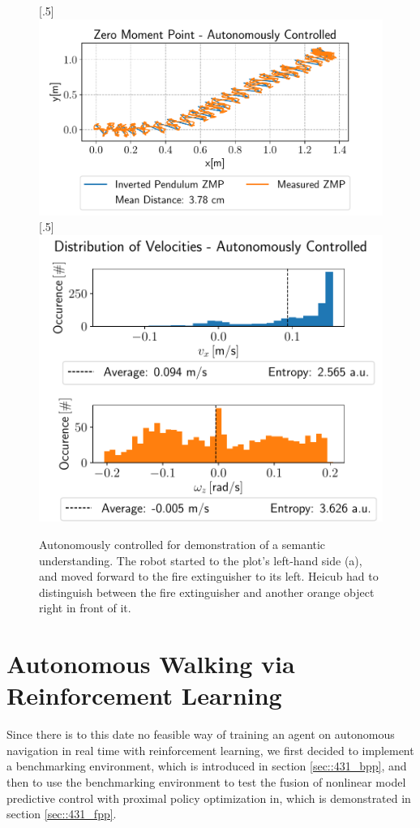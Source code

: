 \begin{figure}[h!]
	[.5\linewidth]{\includegraphics[scale=.45]{chapters/11_autonomous_walking_experiments/img/semantic_walk_01_zmp.pdf}}
	[.5\linewidth]{\includegraphics[scale=.45]{chapters/11_autonomous_walking_experiments/img/semantic_walk_01_entropy.pdf}}
	\caption{Autonomously controlled for demonstration of a semantic understanding. The robot started to the plot's left-hand side (a), and moved forward to the fire extinguisher to its left. Heicub had to distinguish between the fire extinguisher and another orange object right in front of it.}
	\label{fig::424_aw_additional_semantic}
\end{figure}
\FloatBarrier
\section{Autonomous Walking via Reinforcement Learning}
\label{sec::43_ar}
Since there is to this date no feasible way of training an agent on autonomous navigation in real time with reinforcement learning, we first decided to implement a benchmarking environment, which is introduced in section \ref{sec::431_bpp}, and then to use the benchmarking environment to test the fusion of nonlinear model predictive control with proximal policy optimization in, which is demonstrated in section \ref{sec::431_fpp}.

